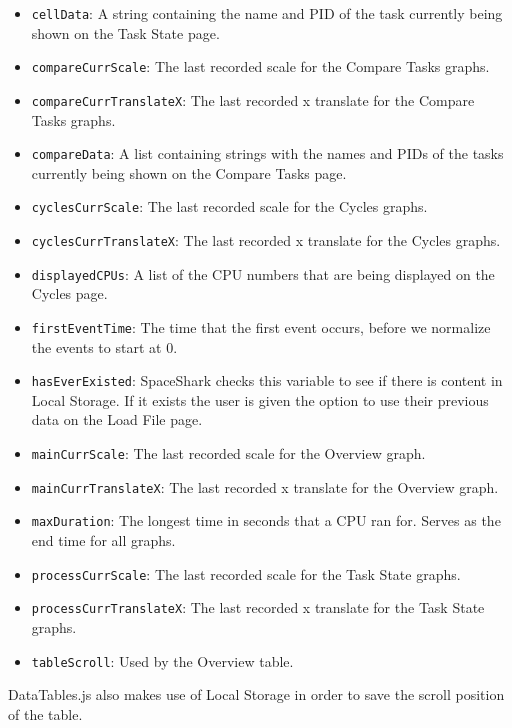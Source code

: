 \documentclass{hmcclinic}
\begin{document}
\begin{itemize}
  \item \texttt{cellData}: A string containing the name and PID of the task currently being
  shown on the Task State page. 
\item \texttt{compareCurrScale}: The last recorded scale for the Compare Tasks graphs.
\item \texttt{compareCurrTranslateX}: The last recorded x translate for the Compare Tasks
  graphs.
\item \texttt{compareData}: A list containing strings with the names and PIDs of the
  tasks currently being shown on the Compare Tasks page.
\item \texttt{cyclesCurrScale}: The last recorded scale for the Cycles graphs.	
\item \texttt{cyclesCurrTranslateX}: The last recorded x translate for the Cycles graphs.
\item \texttt{displayedCPUs}: A list of the CPU numbers that are being displayed on the
  Cycles page.
\item \texttt{firstEventTime}: The time that the first event occurs, before we
  normalize the events to start at 0.
\item \texttt{hasEverExisted}: SpaceShark checks this variable to see if there
  is content in Local Storage. If it exists the user is given the option to use
  their previous data on the Load File page.	
\item \texttt{mainCurrScale}: The last recorded scale for the Overview graph.	
\item \texttt{mainCurrTranslateX}: The last recorded x translate for the Overview graph.
\item \texttt{maxDuration}: The longest time in seconds that a CPU ran for. Serves as
  the end time for all graphs.
\item \texttt{processCurrScale}: The last recorded scale for the Task State graphs.
\item \texttt{processCurrTranslateX}: The last recorded x translate for the Task State
  graphs.
\item \texttt{tableScroll}: Used by the Overview table.
\end{itemize}
DataTables.js also makes use of Local Storage in order to save the scroll position of the table.
\end{document}
